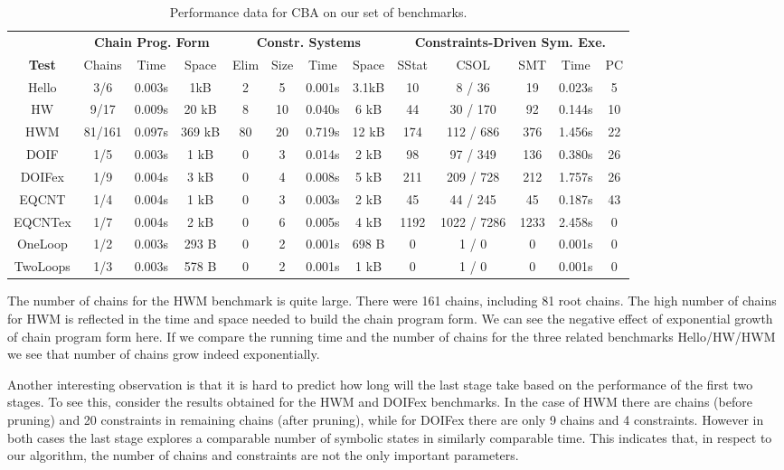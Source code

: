 \documentclass{llncs}
\newcommand{\CBATool}{\textsc{CBA}\xspace}
\begin{document}
\begin{table*}[!htb]
\centering
\vspace{-.3cm}
\begin{tabular}{||*{13}{c|}|}
\hline
&
\multicolumn{3}{c|}{\bf{Chain Prog. Form}} &
\multicolumn{4}{c|}{\bf{Constr. Systems}} &
\multicolumn{5}{c||}{\bf{Constraints-Driven Sym. Exe.}} \\
\cline{2-13}
\bf Test &
Chains & Time & Space &
Elim & Size & Time & Space &
SStat & CSOL & SMT & Time & PC \\
\hline
\hline
Hello & 3/6 & 0.003s & 1kB & 2 & 5 & 0.001s & 3.1kB & 10 & 8 / 36 & 19 & 0.023s & 5 \\
HW & 9/17 & 0.009s & 20 kB & 8 & 10 & 0.040s & 6 kB & 44 & 30 / 170 & 92 & 0.144s & 10 \\
HWM & 81/161 & 0.097s & 369 kB & 80 & 20 & 0.719s & 12 kB & 174 & 112 / 686 & 376 & 1.456s & 22 \\
DOIF & 1/5 & 0.003s & 1 kB & 0 & 3 & 0.014s & 2 kB & 98 & 97 / 349 & 136 & 0.380s & 26 \\
DOIFex & 1/9 & 0.004s & 3 kB & 0 & 4 & 0.008s & 5 kB & 211 & 209 / 728 & 212 & 1.757s & 26 \\
EQCNT & 1/4 & 0.004s & 1 kB & 0 & 3 & 0.003s & 2 kB & 45 & 44 / 245 & 45 & 0.187s & 43 \\
\hline
EQCNTex & 1/7 & 0.004s & 2 kB & 0 & 6 & 0.005s & 4 kB & 1192 & 1022 / 7286 & 1233 & 2.458s & 0 \\
OneLoop & 1/2 & 0.003s & 293 B & 0 & 2 & 0.001s & 698 B & 0 & 1 / 0 & 0 & 0.001s & 0 \\
TwoLoops & 1/3 & 0.003s & 578 B & 0 & 2 & 0.001s & 1 kB & 0 & 1 / 0 & 0 & 0.001s & 0 \\
\hline
\end{tabular}

\medskip
\caption{Performance data for \CBATool on our set of benchmarks.}
\label{TabCBProfile}
\vspace{-1cm}
\end{table*}


The number of chains for the HWM benchmark is quite large.
 There were 161 chains, including 81 root chains.
The high number of chains for HWM is reflected in the time and space needed
to build the chain program form. We can see the negative effect of exponential
growth of chain program form here. If we compare the running time and the number
of chains for the three related benchmarks Hello/HW/HWM we see that number of chains
grow indeed exponentially.

Another interesting observation is that it is hard to predict how long will
the last stage take based on the performance of the first two
stages. To see this, consider the results obtained for the HWM and DOIFex
benchmarks. In the case of HWM there are  chains (before pruning) and 20
constraints in remaining chains (after pruning), while for DOIFex there are only 9 chains and 4
constraints. However in both cases the last stage explores a comparable
number of symbolic states in similarly comparable time. This indicates that,
in respect to our algorithm, the number of chains and constraints are not
the only important parameters.
\end{document}

